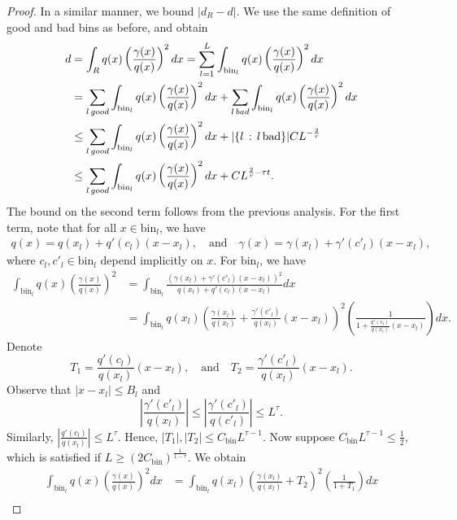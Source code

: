 \documentclass{article}
\newcommand{\bin}{\text{bin}}
\begin{document}
\begin{proof}
In a similar manner, we bound $|d_R - d|$. We use the same definition of good and bad bins as before, and obtain 
\begin{align*}
d &= \int_R q(x) \left( \frac{\gamma(x)}{q(x)} \right)^2 dx = \sum_{l=1}^L \int_{\bin_l} q(x) \left( \frac{\gamma(x)}{q(x)} \right)^2 dx \\
  &= \sum_{l \, good} \int_{\bin_l} q(x) \left( \frac{\gamma(x)}{q(x)} \right)^2 dx +
     \sum_{l \, bad} \int_{\bin_l}  q(x) \left( \frac{\gamma(x)}{q(x)} \right)^2 dx \\
  &\leq \sum_{l\, good} \int_{\bin_l}  q(x) \left( \frac{\gamma(x)}{q(x)} \right)^2 dx +
        |\{ l \,:\, l \, \trm{bad}\}| C L^{-\frac{2}{r}} \\
 & \leq \sum_{l\, good} \int_{\bin_l}  q(x) \left( \frac{\gamma(x)}{q(x)} \right)^2 dx +
        C L^{\frac{2}{r} - \tau t}. 
\end{align*}
The bound on the second term follows from the previous analysis. For the first term, note that for all $x \in \bin_l$, we have
\begin{align*}
q(x) = q(x_l) + q'(c_l)(x-x_l), \quad \text{and} \quad
\gamma(x) = \gamma(x_l) + \gamma'(c'_l)(x - x_l),
\end{align*}
where $c_l, c'_l \in \bin_l$ depend implicitly on $x$. For $\bin_l$, we have
\begin{align*}
\int_{\bin_l} q(x) \left( \frac{\gamma(x)}{q(x)} \right)^2 &=
  \int_{\bin_l} 
      \frac{ (\gamma(x_l) + \gamma'(c'_l)(x - x_l))^2  }{ q(x_l) + q'(c_l)(x-x_l)} dx
  \\
&= \int_{\bin_l} q(x_l)
   \left( \frac{\gamma(x_l)}{q(x_l)} + \frac{\gamma'(c'_l)}{q(x_l)} (x - x_l) \right)^2
  \left( \frac{1}{1 + \frac{q'(c_l)}{q(x_l)} (x - x_l)} \right) dx.
\end{align*}
Denote
\[
T_1 = \frac{q'(c_l)}{q(x_l)} ( x - x_l), \quad \text{and} \quad T_2 = \frac{\gamma'(c'_l)}{q(x_l)} ( x - x_l).
\]
Observe that $|x -x_l| \leq B_l$ and
\[
\left| \frac{\gamma'(c'_l)}{q(x_l)} \right| 
    \leq \left| \frac{\gamma'(c'_l)}{q(c'_l)} \right| \leq L^\tau.
\]
Similarly, $\left| \frac{q'(c_l)}{q(x_l)} \right| \leq L^\tau$. Hence, $|T_1|, |T_2| \leq C_\bin L^{\tau -1}$. Now suppose $C_\bin L^{\tau -1} \leq \frac{1}{2} $, which is satisfied if $L \geq (2 C_\bin)^{\frac{1}{1-\tau}}$. We obtain
\begin{align*}
\int_{\bin_l} q(x) \left( \frac{\gamma(x)}{q(x)} \right)^2 dx &= \int_{\bin_l} q(x_l) 
       \left( \frac{\gamma(x_l)}{q(x_l)} + T_2 \right)^2 
        \left( \frac{1}{ 1 + T_1 } \right) dx  \\

\end{align*}
\end{proof}
\end{document}
